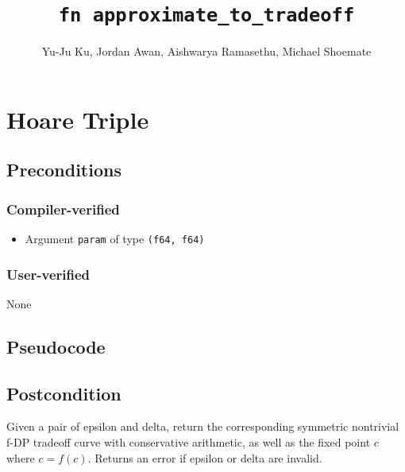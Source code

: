 \documentclass{article}
\title{\texttt{fn approximate\_to\_tradeoff}}
\author{Yu-Ju Ku, Jordan Awan, Aishwarya Ramasethu, Michael Shoemate}
\begin{document}
\maketitle

\section{Hoare Triple}

\subsection*{Preconditions}
\subsubsection*{Compiler-verified}
\begin{itemize}
    \item Argument \texttt{param} of type \texttt{(f64, f64)}
\end{itemize}

\subsubsection*{User-verified}
None

\subsection*{Pseudocode}



\subsection*{Postcondition}

\begin{theorem}
    Given a pair of epsilon and delta, return the corresponding symmetric nontrivial f-DP tradeoff curve
    with conservative arithmetic, 
    as well as the fixed point $c$ where $c = f(c)$.
    Returns an error if epsilon or delta are invalid.
\end{theorem}
\end{document}
